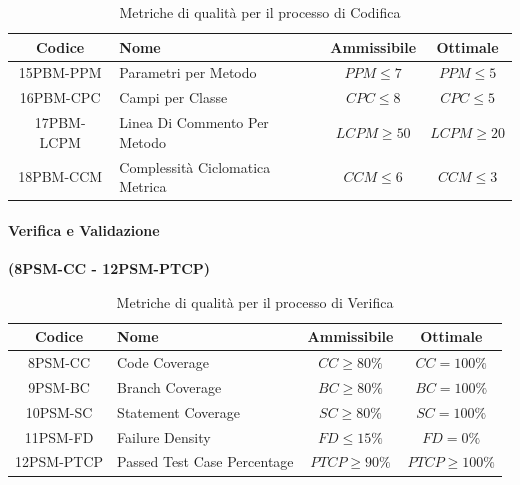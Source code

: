 \documentclass{article}
\begin{document}
\begin{table}[H]
    \centering
    \renewcommand{\arraystretch}{1.5} %
    \begin{tabular}{|c|l|c|c|}
        \hline
        \textbf{Codice} & \textbf{Nome} & \textbf{Ammissibile} & \textbf{Ottimale} \\
        \hline
        15PBM-PPM & Parametri per Metodo & $PPM \leq 7$ & $PPM \leq 5$\\
        16PBM-CPC & Campi per Classe & $CPC \leq 8$ & $CPC \leq 5$ \\
        17PBM-LCPM & Linea Di Commento Per Metodo & $LCPM \geq 50$ & $LCPM \geq 20$ \\
        18PBM-CCM & Complessità Ciclomatica Metrica & $CCM \leq 6$ & $CCM \leq 3$ \\
        \hline
    \end{tabular}
    \label{tab:codifica}
    \caption{Metriche di qualità per il processo di Codifica}
\end{table}

\paragraph{Verifica e Validazione}%
\textbf{(8PSM-CC - 12PSM-PTCP)}

\begin{table}[H]
    \centering
    \renewcommand{\arraystretch}{1.5} %
    \begin{tabular}{|c|l|c|c|}
        \hline
        \textbf{Codice} & \textbf{Nome} & \textbf{Ammissibile} & \textbf{Ottimale} \\
        \hline
        8PSM-CC & Code Coverage & $CC \geq 80\%$ & $CC = 100\%$ \\
        9PSM-BC & Branch Coverage & $BC \geq 80\%$ & $BC = 100\%$ \\
        10PSM-SC & Statement Coverage & $SC \geq 80\%$ & $SC = 100\%$ \\
        11PSM-FD & Failure Density & $FD \leq 15\%$ & $FD = 0\%$ \\
        12PSM-PTCP & Passed Test Case Percentage & $PTCP \geq 90\%$ & $PTCP \geq 100\%$ \\
        \hline
    \end{tabular}
    \label{tab:verifica}
    \caption{Metriche di qualità per il processo di Verifica}
\end{table}
\end{document}
